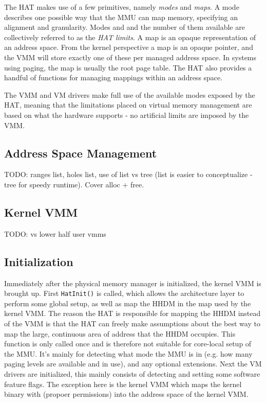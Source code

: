 The HAT makes use of a few primitives, namely \textit{modes} and \textit{maps}. A mode describes one possible way that the MMU can map memory, specifying an alignment and granularity. Modes and and the number of them available are collectively referred to as the \textit{HAT limits}. A map is an opaque representation of an address space. From the kernel perspective a map is an opaque pointer, and the VMM will store exactly one of these per managed address space. In systems using paging, the map is usually the root page table. The HAT also provides a handful of functions for managing mappings within an address space.

The VMM and VM drivers make full use of the available modes exposed by the HAT, meaning that the limitations placed on virtual memory management are based on what the hardware supports - no artificial limits are imposed by the VMM.

\subsection{Address Space Management}
TODO: ranges list, holes list, use of list vs tree (list is easier to conceptualize - tree for speedy runtime).
Cover alloc + free.

\subsection{Kernel VMM}
TODO: vs lower half user vmms

\subsection{Initialization}
Immediately after the physical memory manager is initialized, the kernel VMM is brought up. First \verb|HatInit()| is called, which allows the architecture layer to perform some global setup, as well as map the HHDM in the map used by the kernel VMM. The reason the HAT is responsible for mapping the HHDM instead of the VMM is that the HAT can freely make assumptions about the best way to map the large, continuous area of address that the HHDM occupies. This function is only called once and is therefore not suitable for core-local setup of the MMU. It's mainly for detecting what mode the MMU is in (e.g. how many paging levels are available and in use), and any optional extensions. Next the VM drivers are initialized, this mainly consists of detecting and setting some software feature flags. The exception here is the kernel VMM which maps the kernel binary with (propoer permissions) into the address space of the kernel VMM.

